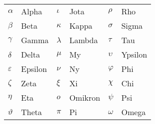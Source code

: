 \begin{tabular}{ll|ll|ll}
  $\alpha$      & Alpha   & $\iota$   & Jota    & $\rho$     & Rho     \\
  $\beta$       & Beta    & $\kappa$  & Kappa   & $\sigma$   & Sigma   \\
  $\gamma$      & Gamma   & $\lambda$ & Lambda  & $\tau$     & Tau     \\
  $\delta$      & Delta   & $\mu$     & My      & $\upsilon$ & Ypsilon \\
  $\varepsilon$ & Epsilon & $\nu$     & Ny      & $\varphi$  & Phi     \\
  $\zeta$       & Zeta    & $\xi$     & Xi      & $\chi$     & Chi     \\
  $\eta$        & Eta     & $o$       & Omikron & $\psi$     & Psi     \\
  $\vartheta$   & Theta   & $\pi$     & Pi      & $\omega$   & Omega   \\
\end{tabular}


